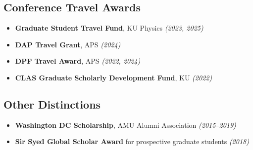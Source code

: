 \documentclass[10pt]{report}
\begin{document}
\subsection*{Conference Travel Awards}
\begin{itemize}
    \item \textbf{Graduate Student Travel Fund}, KU Physics \textit{(2023, 2025)}
    \item \textbf{DAP Travel Grant}, APS \textit{(2024)}
    \item \textbf{DPF Travel Award}, APS \textit{(2022, 2024)}
    \item \textbf{CLAS Graduate Scholarly Development Fund}, KU \textit{(2022)}
\end{itemize}

\subsection*{Other Distinctions}
\begin{itemize}
    \item \textbf{Washington DC Scholarship}, AMU Alumni Association \textit{(2015--2019)}
    \item \textbf{Sir Syed Global Scholar Award} for prospective graduate students \textit{(2018)}
\end{itemize}

\end{document}
